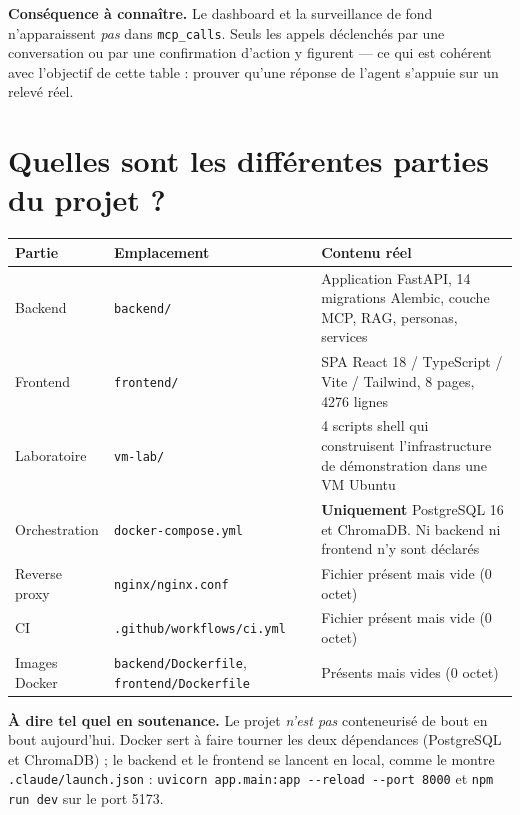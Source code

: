 \documentclass[11pt,a4paper]{report}
\newcommand{\file}[1]{\texttt{\small #1}}
\newcommand{\tbl}[1]{\texttt{\small\textcolor{oasisamber}{#1}}}
\begin{document}
\begin{infobox}
\textbf{Conséquence à connaître.} Le dashboard et la surveillance de fond
n'apparaissent \emph{pas} dans \tbl{mcp\_calls}. Seuls les appels déclenchés par
une conversation ou par une confirmation d'action y figurent --- ce qui est
cohérent avec l'objectif de cette table : prouver qu'une réponse de l'agent
s'appuie sur un relevé réel.
\end{infobox}

\section{Quelles sont les différentes parties du projet ?}

\begin{longtable}{@{}p{2.6cm}p{3.2cm}p{8.7cm}@{}}
\toprule
\textbf{Partie} & \textbf{Emplacement} & \textbf{Contenu réel}\\
\midrule
\endhead
Backend & \file{backend/} & Application FastAPI, 14 migrations Alembic, couche MCP, RAG, personas, services\\
Frontend & \file{frontend/} & SPA React 18 / TypeScript / Vite / Tailwind, 8 pages, 4276 lignes\\
Laboratoire & \file{vm-lab/} & 4 scripts shell qui construisent l'infrastructure de démonstration dans une VM Ubuntu\\
Orchestration & \file{docker-compose.yml} & \textbf{Uniquement} PostgreSQL 16 et ChromaDB. Ni backend ni frontend n'y sont déclarés\\
Reverse proxy & \file{nginx/nginx.conf} & \textcolor{oasisred}{Fichier présent mais vide (0 octet)}\\
CI & \file{.github/workflows/ci.yml} & \textcolor{oasisred}{Fichier présent mais vide (0 octet)}\\
Images Docker & \file{backend/Dockerfile}, \file{frontend/Dockerfile} & \textcolor{oasisred}{Présents mais vides (0 octet)}\\
\bottomrule
\end{longtable}

\begin{warnbox}
\textbf{À dire tel quel en soutenance.} Le projet \emph{n'est pas} conteneurisé
de bout en bout aujourd'hui. Docker sert à faire tourner les deux dépendances
(PostgreSQL et ChromaDB) ; le backend et le frontend se lancent en local, comme
le montre \file{.claude/launch.json} : \texttt{uvicorn app.main:app -{}-reload
-{}-port 8000} et \texttt{npm run dev} sur le port 5173.
\end{warnbox}
\end{document}
